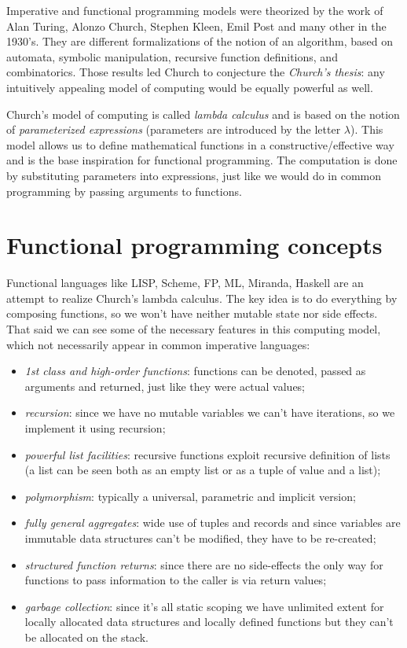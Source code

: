 Imperative and functional programming models were theorized by the work of Alan Turing, Alonzo Church, Stephen Kleen, Emil Post and many other in the 1930's.
They are different formalizations of the notion of an algorithm, based on automata, symbolic manipulation, recursive function  definitions, and combinatorics.
Those results led Church to conjecture the \emph{Church's thesis}: any intuitively appealing model of computing would be equally powerful as well.

Church's model of computing is called \emph{lambda calculus} and is based on the notion of \emph{parameterized expressions} (parameters are introduced by the letter $\lambda$).
This model allows us to define mathematical functions in a constructive/effective way and is the base inspiration for functional programming.
The computation is done by substituting parameters into expressions, just like we would do in common programming by passing arguments to functions.

\section{Functional programming concepts}
Functional languages like LISP, Scheme, FP, ML, Miranda, Haskell are an attempt to realize Church's lambda calculus.
The key idea is to do everything by composing functions, so we won't have neither mutable state nor side effects.
That said we can see some of the necessary features in this computing model, which not necessarily appear in common imperative languages:
\begin{itemize}
    \item \emph{1st class and high-order functions}: functions can be denoted, passed as arguments and returned, just like they were actual values;

    \item \emph{recursion}: since we have no mutable variables we can't have iterations, so we implement it using recursion;

    \item \emph{powerful list facilities}: recursive functions exploit recursive definition of lists (a list can be seen both as an empty list or as a tuple of value and a list);

    \item \emph{polymorphism}: typically a universal, parametric and implicit version;

    \item \emph{fully general aggregates}: wide use of tuples and records and since variables are immutable data structures can't be modified, they have to be re-created;

    \item \emph{structured function returns}: since there are no side-effects the only way for functions to pass information to the caller is via return values;

    \item \emph{garbage collection}: since it's all static scoping we have unlimited extent for locally allocated data structures and locally defined functions but they can't be allocated on the stack.
\end{itemize}


